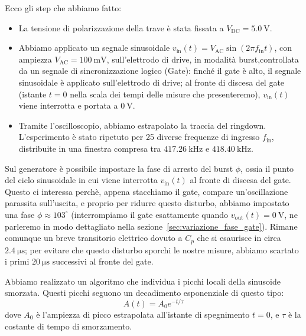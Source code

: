 \documentclass[11pt,a4paper]{article}
\begin{document}
\vspace{0.3cm}
\noindent Ecco gli step che abbiamo fatto:

\begin{itemize}
    \item La tensione di polarizzazione della trave è stata fissata a $V_{\text{DC}} = \SI{5.0}{\volt}$.
    \item Abbiamo applicato un segnale sinusoidale $v_{\text{in}}(t) = V_{\text{AC}} \sin(2\pi f_{\text{in}} t)$, con ampiezza $V_{\text{AC}} = \SI{100}{\milli\volt}$, sull'elettrodo di drive, in modalità burst,controllata da un segnale di sincronizzazione logico (Gate): finché il gate è alto, il segnale sinusoidale è applicato sull'elettrodo di drive; al fronte di discesa del gate (istante $t = 0$ nella scala dei tempi delle misure che presenteremo), $v_{\text{in}}(t)$ viene interrotta e portata a $\SI{0}{\volt}$.
    \item Tramite l'oscilloscopio, abbiamo estrapolato la traccia del ringdown. L'esperimento è stato ripetuto per 25 diverse frequenze di ingresso $f_{\text{in}}$, distribuite in una finestra compresa tra $\SI{417.26}{\kilo\hertz}$ e $\SI{418.40}{\kilo\hertz}$.
\end{itemize}


\vspace{0.3cm}

\noindent Sul generatore è possibile impostare la fase di arresto del burst $\phi$, ossia il punto del ciclo sinusoidale in cui viene interrotta $v_{\text{in}}(t)$ al fronte di discesa del gate. Questo ci interessa perchè, appena stacchiamo il gate, compare un'oscillazione parassita sull'uscita, e proprio per ridurre questo disturbo, abbiamo impostato una fase $\phi \approx 103^\circ$ (interrompiamo il gate esattamente quando $v_{\text{out}}(t)=\SI{0}{\volt}$, ne parleremo in modo dettagliato nella sezione~\ref{sec:variazione_fase_gate}). Rimane comunque un breve transitorio elettrico dovuto a $C_p$ che si esaurisce in circa $\SI{2.4}{\micro\second}$; per evitare che questo disturbo sporchi le nostre misure, abbiamo scartato i primi $\SI{20}{\micro\second}$ successivi al fronte del gate. 

\vspace{0.3cm}
\noindent Abbiamo realizzato un algoritmo che individua i picchi locali della sinusoide smorzata. Questi picchi seguono un decadimento esponenziale di questo tipo:
\begin{equation}
        \label{eq:legge_decadimento}
        A(t) = A_0 e^{-t/\tau}
    \end{equation}
dove $A_0$ è l'ampiezza di picco estrapolata all'istante di spegnimento $t=0$, e $\tau$ è la costante di tempo di smorzamento.
\end{document}
